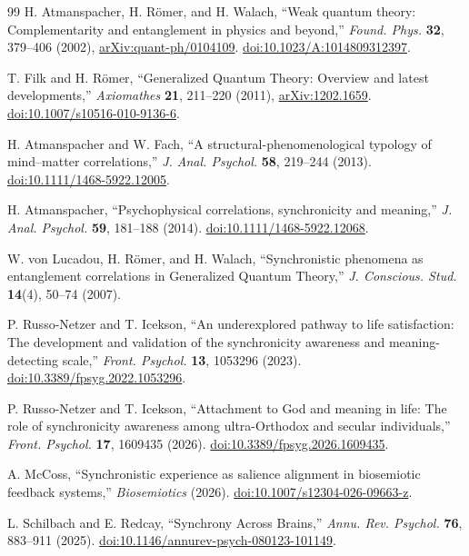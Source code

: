 \documentclass[11pt]{article}
\begin{document}
\begin{thebibliography}{99}
H. Atmanspacher, H. R\"omer, and H. Walach,
``Weak quantum theory: Complementarity and entanglement in physics and beyond,''
\emph{Found. Phys.} \textbf{32}, 379--406 (2002),
\href{https://arxiv.org/abs/quant-ph/0104109}{arXiv:quant-ph/0104109}.
\href{https://doi.org/10.1023/A:1014809312397}{doi:10.1023/A:1014809312397}.

T. Filk and H. R\"omer,
``Generalized Quantum Theory: Overview and latest developments,''
\emph{Axiomathes} \textbf{21}, 211--220 (2011),
\href{https://arxiv.org/abs/1202.1659}{arXiv:1202.1659}.
\href{https://doi.org/10.1007/s10516-010-9136-6}{doi:10.1007/s10516-010-9136-6}.

H. Atmanspacher and W. Fach,
``A structural-phenomenological typology of mind--matter correlations,''
\emph{J. Anal. Psychol.} \textbf{58}, 219--244 (2013).
\href{https://doi.org/10.1111/1468-5922.12005}{doi:10.1111/1468-5922.12005}.

H. Atmanspacher,
``Psychophysical correlations, synchronicity and meaning,''
\emph{J. Anal. Psychol.} \textbf{59}, 181--188 (2014).
\href{https://doi.org/10.1111/1468-5922.12068}{doi:10.1111/1468-5922.12068}.

W. von Lucadou, H. R\"omer, and H. Walach,
``Synchronistic phenomena as entanglement correlations in Generalized Quantum Theory,''
\emph{J. Conscious. Stud.} \textbf{14}(4), 50--74 (2007).

P. Russo-Netzer and T. Icekson,
``An underexplored pathway to life satisfaction: The development and validation of the synchronicity awareness and meaning-detecting scale,''
\emph{Front. Psychol.} \textbf{13}, 1053296 (2023).
\href{https://doi.org/10.3389/fpsyg.2022.1053296}{doi:10.3389/fpsyg.2022.1053296}.

P. Russo-Netzer and T. Icekson,
``Attachment to God and meaning in life: The role of synchronicity awareness among ultra-Orthodox and secular individuals,''
\emph{Front. Psychol.} \textbf{17}, 1609435 (2026).
\href{https://doi.org/10.3389/fpsyg.2026.1609435}{doi:10.3389/fpsyg.2026.1609435}.

A. McCoss,
``Synchronistic experience as salience alignment in biosemiotic feedback systems,''
\emph{Biosemiotics} (2026).
\href{https://doi.org/10.1007/s12304-026-09663-z}{doi:10.1007/s12304-026-09663-z}.

L. Schilbach and E. Redcay,
``Synchrony Across Brains,''
\emph{Annu. Rev. Psychol.} \textbf{76}, 883--911 (2025).
\href{https://doi.org/10.1146/annurev-psych-080123-101149}{doi:10.1146/annurev-psych-080123-101149}.


\end{thebibliography}
\end{document}
